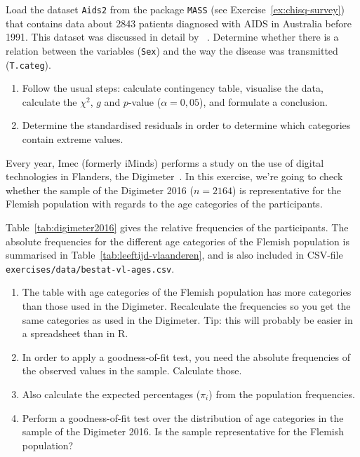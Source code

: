 \begin{exercise}
  \label{ex:chisq-aids2}
  Load the dataset \texttt{Aids2} from the package \texttt{MASS} (see Exercise~\ref{ex:chisq-survey}) that contains data about 2843 patients diagnosed with AIDS in Australia before 1991. This dataset was discussed in detail by ~\textcite{Ripley2007}. Determine whether there is a relation between the variables (\texttt{Sex}) and the way the disease was transmitted (\texttt{T.categ}).
  
  \begin{enumerate}
    \item Follow the usual steps: calculate contingency table, visualise the data, calculate the $\chi^2$, $g$ and $p$-value ($\alpha = 0,05$), and formulate a conclusion.
    \item Determine the standardised residuals in order to determine which categories contain extreme values.
  \end{enumerate}
  
\end{exercise}

\begin{exercise}
  \label{ex:chisq-digimeter}
  
  Every year, Imec (formerly iMinds) performs a study on the use of digital technologies in Flanders, the Digimeter~\autocite{Vanhaelewyn2016}. In this exercise, we're going to check whether the sample of the Digimeter 2016 ($n = 2164$) is representative for the Flemish population with regards to the age categories of the participants.
  
  Table~\ref{tab:digimeter2016} gives the relative frequencies of the participants. The absolute frequencies for the different age categories of the Flemish population is summarised in Table~\ref{tab:leeftijd-vlaanderen}, and is also included in CSV-file \texttt{exercises/data/bestat-vl-ages.csv}.
  
  \begin{enumerate}
    \item The table with age categories of the Flemish population has more categories than those used in the Digimeter. Recalculate the frequencies so you get the same categories as used in the Digimeter. Tip: this will probably be easier in a spreadsheet than in R.
    \item In order to apply a goodness-of-fit test, you need the absolute frequencies of the observed values in the sample. Calculate those.
    \item Also calculate the expected percentages ($\pi_{i}$) from the population frequencies.
    \item Perform a goodness-of-fit test over the distribution of age categories in the sample of the Digimeter 2016. Is the sample representative for the Flemish population?
  \end{enumerate}
\end{exercise}

